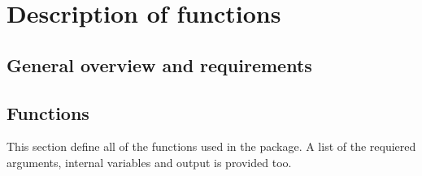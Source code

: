 \chapter{Description of functions}\label{Functions}
\section{General overview and requirements}
\section{Functions}
This section define all of the functions used in the package. A list of the requiered arguments, internal variables and output is provided too. \\






















